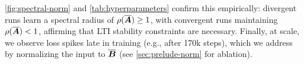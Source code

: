 \cref{fig:spectral-norm} and \cref{tab:hyperparameters} confirm this empirically:
divergent runs learn a spectral radius of $\rho(\overline{\bm{A}}) \geq 1$, with convergent runs maintaining $\rho(\overline{\bm{A}}) < 1$, affirming that LTI stability constraints are necessary. 
Finally, at scale, we observe loss spikes late in training 
(e.g., after 170k steps), which we address by normalizing the input to $\overline{\bm{B}}$ (see \cref{sec:prelude-norm} for ablation).





